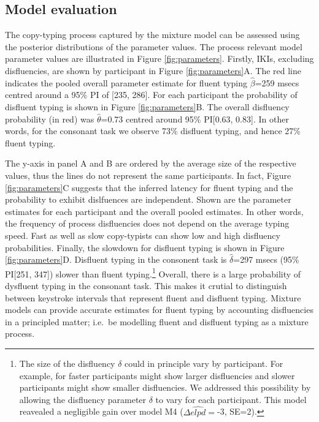 \documentclass[english,jou,floatsintext]{apa7}
\begin{document}
\hypertarget{model-evaluation}{%
\subsection{Model evaluation}\label{model-evaluation}}

The copy-typing process captured by the mixture model can be assessed using the posterior distributions of the parameter values. The process relevant model parameter values are illustrated in Figure \ref{fig:parameters}. Firstly, IKIs, excluding disfluencies, are shown by participant in Figure \ref{fig:parameters}A. The red line indicates the pooled overall parameter estimate for fluent typing \(\hat{\beta}\)=259 msecs centred around a 95\% PI of {[}235, 286{]}. For each participant the probability of disfluent typing is shown in Figure \ref{fig:parameters}B. The overall disfluency probability (in red) was \(\hat{\theta}\)=0.73 centred around 95\% PI{[}0.63, 0.83{]}. In other words, for the consonant task we observe 73\% disfluent typing, and hence 27\% fluent typing.

The y-axis in panel A and B are ordered by the average size of the respective values, thus the lines do not represent the same participants. In fact, Figure \ref{fig:parameters}C suggests that the inferred latency for fluent typing and the probability to exhibit dislfuences are independent. Shown are the parameter estimates for each participant and the overall pooled estimates. In other words, the frequency of process disfluencies does not depend on the average typing speed. Fast as well as slow copy-typists can show low and high disfluency probabilities. Finally, the slowdown for disfluent typing is shown in Figure \ref{fig:parameters}D. Disfluent typing in the consonent task is \(\hat{\delta}\)=297 msecs (95\% PI{[}251, 347{]}) slower than fluent typing.\footnote{The size of the disfluency \(\delta\) could in principle vary by participant. For example, for faster participants might show larger disfluencies and slower participants might show smaller disfluencies. We addressed this possibility by allowing the disfluency parameter \(\delta\) to vary for each participant. This model reavealed a negligible gain over model M4 (\(\Delta\widehat{elpd}=\)-3, SE=2).} Overall, there is a large probability of dysfluent typing in the consonant task. This makes it crutial to distinguish between keystroke intervals that represent fluent and disfluent typing. Mixture models can provide accurate estimates for fluent typing by accounting disfluencies in a principled matter; i.e.~be modelling fluent and disfluent typing as a mixture process.
\end{document}
